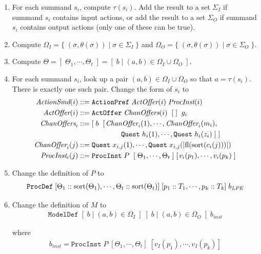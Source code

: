 \begin{enumerate}
\item For each summand $s_i$, compute $\tau(s_i)$.
Add the result to a set $\Sigma_I$ if summand $s_i$ contains input actions, or add the result to a set $\Sigma_O$ if summand $s_i$ contains output actions (only one of these can be true).

\item Compute $\Omega_I = \{ \; (\sigma, \theta(\sigma)) \;|\; \sigma \in \Sigma_I \; \}$ and $\Omega_O = \{ \; (\sigma, \theta(\sigma)) \;|\; \sigma \in \Sigma_O \; \}$.

\item Compute $\Theta = [ \; \Theta_1, \cdots{}, \Theta_t \; ] = [ \; b \;|\; (a, b) \in \Omega_I \cup \Omega_O \; ]$.

\item For each summand $s_i$, look up a pair $(a, b) \in \Omega_I \cup \Omega_O$ so that $a = \tau(s_i)$.
There is exactly one such pair.
Change the form of $s_i$ to
\begin{align*}
\textit{ActionSmd}(i) &::= \texttt{ActionPref} \; \textit{ActOffer}(i) \; \textit{ProcInst}(i) \\
\textit{ActOffer}(i) &::= \texttt{ActOffer} \; \textit{ChanOffers}(i) \;\; [ \; ] \;\; g_i \\
\textit{ChanOffers}_i &::= [ \; b \;\; [ \;\! \textit{ChanOffer}_i(1), \cdots{}, \textit{ChanOffer}_i(m_i), \\
&\qquad \qquad \qquad \texttt{Quest} \; h_i(1), \cdots{}, \texttt{Quest} \; h_i(z_i) \; ] \; ] \\
\textit{ChanOffer}_i(j) &::= \texttt{Quest} \; x_{i,j}(1), \cdots{}, \texttt{Quest} \; x_{i,j}(|\text{fl}(\text{sort}(c_i(j)))|) \\
\textit{ProcInst}_i(j) &::= \texttt{ProcInst} \; P \; \; [ \; \Theta_1, \cdots{}, \Theta_t \; ] \; [\;\!v_i(p_1), \cdots{}, v_i(p_k) \; ]
\end{align*}

\item Change the definition of $P$ to
\begin{align*}
\texttt{ProcDef} \; [\Theta_1 :: \text{sort}(\Theta_1), \cdots{}, \Theta_t :: \text{sort}(\Theta_t)] \; [p_1 :: T_1, \cdots{}, p_k :: T_k] \; b_\textit{LPE}
\end{align*}

\item Change the definition of $M$ to
\begin{align*}
\texttt{ModelDef} \; [ \; b \;|\; (a, b) \in \Omega_I \; ] \; [ \; b \;|\; (a, b) \in \Omega_O \; ] \; b_\textit{inst}
\end{align*}

where
\begin{align*}
b_\textit{inst} = \texttt{ProcInst} \; P \; [\Theta_1, \cdots{}, \Theta_t] \; [v_I(p_1), \cdots{}, v_I(p_k)]
\end{align*}
\end{enumerate}

